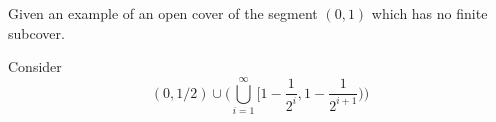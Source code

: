   \begin{exercise}[Rudin 2.14]
    Given an example of an open cover of the segment $(0, 1)$ which has no finite subcover. 
  \end{exercise}
  \begin{solution}
    Consider 
    \begin{equation}
      (0, 1/2) \cup \bigg( \bigcup_{i=1}^\infty \Big[ 1 - \frac{1}{2^i}, 1 - \frac{1}{2^{i+1}} \Big) \bigg)
    \end{equation}
  \end{solution}

  \begin{exercise}[Rudin 2.15]

  \end{exercise}
  \begin{solution}
    
  \end{solution}

